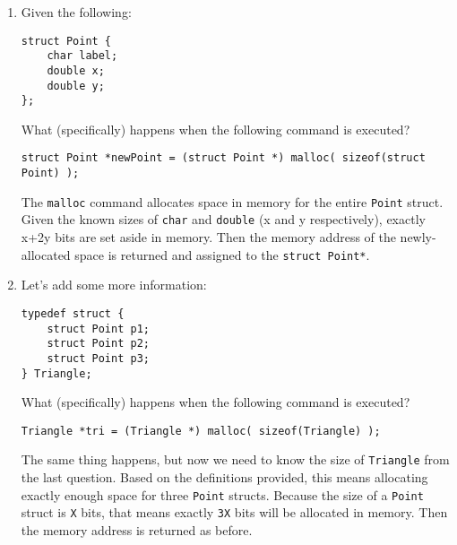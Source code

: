 \begin{enumerate}
\item Given the following:
\begin{lstlisting}[numbers=none]
struct Point {
	char label;
	double x;
	double y;
};
\end{lstlisting}

What (specifically) happens when the following command is executed?

\hspace{15mm} \texttt{struct Point *newPoint = (struct Point *) malloc( sizeof(struct Point) );}

\begin{answer}
The \texttt{malloc} command allocates space in memory for the entire \texttt{Point} struct.
Given the known sizes of \texttt{char} and \texttt{double} (x and y respectively), exactly x+2y bits are set aside in memory.
Then the memory address of the newly-allocated space is returned and assigned to the \texttt{struct Point*}.
\end{answer}

\item Let's add some more information:
\begin{lstlisting}[numbers=none]
typedef struct {
	struct Point p1;
	struct Point p2;
	struct Point p3;
} Triangle;
\end{lstlisting}

What (specifically) happens when the following command is executed?

\hspace{15mm} \texttt{Triangle *tri = (Triangle *) malloc( sizeof(Triangle) );}

\begin{answer}
The same thing happens, but now we need to know the size of \texttt{Triangle} from the last question.
Based on the definitions provided, this means allocating exactly enough space for three \texttt{Point} structs.
Because the size of a \texttt{Point} struct is \texttt{X} bits, that means exactly \texttt{3X} bits will be allocated in memory.
Then the memory address is returned as before.
\end{answer}
\end{enumerate}
